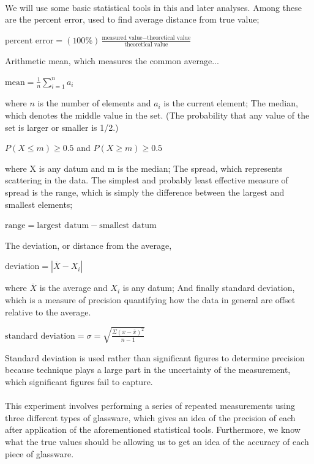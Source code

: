 \documentclass[fleqn,titlepage]{article}
\begin{document}
  \paragraph{} We will use some basic statistical tools in this and later analyses. Among these are the percent error, used to find average distance from true value;
  \begin{center}$\text{percent error} = (100\%)
    \frac{\text{measured\ value} - \text{theoretical\ value}}{\text{theoretical\ value}}$\end{center}
  Arithmetic mean, which measures the common average...
  \begin{center}$\text{mean}=\frac{1}{n}\sum\limits_{i=1}^n a_i$\end{center} where $n$ is the number of elements and $a_i$ is the current element;
  The median, which denotes the middle value in the set. (The probability that any value of the set is larger or smaller is 1/2.)
  \begin{center}$P(X \le m) \ge 0.5$ and $P(X \ge m) \ge 0.5$\end{center} where X is any datum and m is the median;
  The spread, which represents scattering in the data. The simplest and probably least effective measure of spread is the range, which is simply the difference between the largest and smallest elements;
  \begin{center}$\text{range} = \text{largest datum} - \text{smallest datum}$\end{center}
  The deviation, or distance from the average,
  \begin{center} $\text{deviation} = |\overline{X} - X_i|$\end{center} where $\overline{X}$ is the average and $X_i$ is any datum;
  And finally standard deviation, which is a measure of precision quantifying how the data in general are offset relative to the average. 
 \begin{center}$\text{standard deviation} = \sigma = 
  \sqrt{\frac{\Sigma (x-\bar{x})^2}{n-1}}$\end{center}
  Standard deviation is used rather than significant figures to determine precision because technique plays a large part in the uncertainty of the measurement, which significant figures fail to capture.
  \paragraph{} This experiment involves performing a series of repeated measurements using three different types of glassware, which gives an idea of the precision of each after application of the aforementioned statistical tools.
  Furthermore, we know what the true values should be allowing us to get an idea of the accuracy of each piece of glassware.
\end{document}
